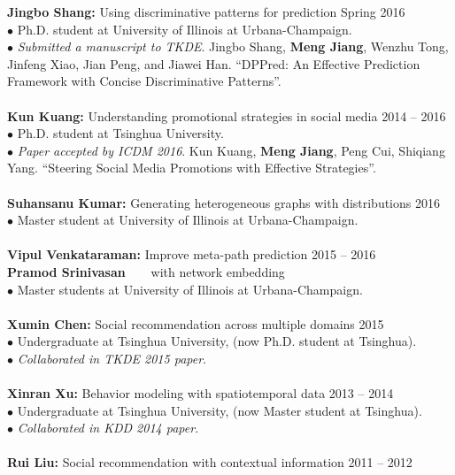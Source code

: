 \documentclass[margin, 10pt]{res}
\begin{document}
\begin{resume}
{\textbf{Jingbo Shang:} Using discriminative patterns for prediction} \hfill{Spring 2016} \\
$\bullet$ Ph.D. student at University of Illinois at Urbana-Champaign. \\
$\bullet$ \textit{Submitted a manuscript to TKDE}. Jingbo Shang, \textbf{Meng Jiang}, Wenzhu Tong, Jinfeng Xiao, Jian Peng, and Jiawei Han. ``DPPred: An Effective Prediction Framework with Concise Discriminative Patterns''. \\ \\
{\textbf{Kun Kuang:} Understanding promotional strategies in social media} \hfill{2014 -- 2016} \\
$\bullet$ Ph.D. student at Tsinghua University. \\
$\bullet$ \textit{Paper accepted by ICDM 2016}. Kun Kuang, \textbf{Meng Jiang}, Peng Cui, Shiqiang Yang. ``Steering Social Media Promotions with Effective Strategies''. \\ \\
{\textbf{Suhansanu Kumar:} Generating heterogeneous graphs with distributions} \hfill{2016} \\
$\bullet$ Master student at University of Illinois at Urbana-Champaign. \\ \\
{\textbf{Vipul Venkataraman:} Improve meta-path prediction} \hfill{2015 -- 2016} \\
{\textbf{Pramod Srinivasan~~~} with network embedding} \\
$\bullet$ Master students at University of Illinois at Urbana-Champaign. \\ \\
{\textbf{Xumin Chen:} Social recommendation across multiple domains} \hfill{2015} \\
$\bullet$ Undergraduate at Tsinghua University, (now Ph.D. student at Tsinghua). \\
$\bullet$ \textit{Collaborated in TKDE 2015 paper}. \\ \\
{\textbf{Xinran Xu:} Behavior modeling with spatiotemporal data} \hfill{2013 -- 2014} \\
$\bullet$ Undergraduate at Tsinghua University, (now Master student at Tsinghua). \\
$\bullet$ \textit{Collaborated in KDD 2014 paper}. \\ \\
{\textbf{Rui Liu:} Social recommendation with contextual information} \hfill{2011 -- 2012} \\

\end{resume}
\end{document}
